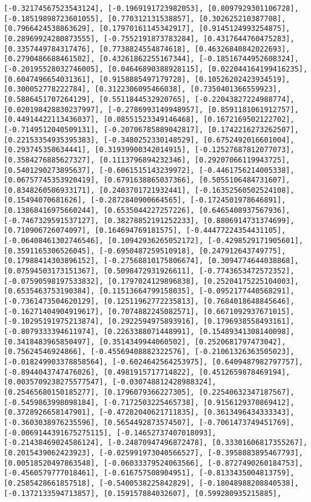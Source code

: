 \documentclass[11pt]{article}
\begin{document}
\begin{Verbatim}[commandchars=\\\{\}]
[-0.32174567523543124], [-0.1969191723982053], [0.8097929301106728], [-0.18519898723601055], [0.770312131538857], [0.302625210387708], [0.7966424538863629], [0.17970161145342917], [0.9145124993254875], [0.28969924280873555], [-0.7552191873783284], [0.4317644760475283], [0.3357449784317476], [0.7738824554874618], [0.46326840842022693], [0.2790486688461502], [0.43261862255167344], [-0.18516744952608324], [-0.20195528032746005], [0.04646890388928115], [0.022044164199416235], [0.6047496654031361], [0.9158885497179728], [0.10526202423934519], [0.300052778222784], [0.3122306095466038], [0.7350401366559923], [0.5886451707264129], [0.5511844532920765], [-0.22043827224988774], [0.020198428830237997], [-0.2786993149948957], [0.8591181061912757], [0.44914422113436037], [0.08551523349146468], [0.1672169502122702], [-0.7149512040509131], [-0.20706785889042817], [0.1742216273262507], [0.22153354935395383], [-0.3480252330148529], [0.6752492016601004], [0.293745350634441], [0.31939900342014915], [-0.12527687812077073], [0.3584276885627327], [0.1113796894232346], [0.29207066119943725], [0.5401290273895637], [-0.6061515143239972], [-0.4461756214005338], [0.06757745353920419], [0.6791638865037366], [0.5055106484731607], [0.8348260506933171], [0.2403701721932441], [-0.16352560502524108], [0.15494070681626], [-0.2872840900664565], [-0.1724501978646891], [0.13868416975660244], [0.6535044227257226], [0.6465408937567936], [-0.7467329591537127], [0.38278852191252233], [0.8806914731374699], [0.710906726074097], [0.164694769181575], [-0.44477224354431105], [-0.06408461302746546], [0.10942936265052172], [-0.4298529171905601], [0.3591165306526045], [-0.6950487259510918], [0.247912643749775], [0.17988414303896152], [-0.27568810175806674], [0.3094774644038868], [0.07594503173151367], [0.5098472931926611], [-0.7743653472572352], [-0.07590598197533832], [0.1797024129896838], [0.25204175225104003], [0.6535463753190384], [0.11513664799158035], [-0.0952177440568291], [-0.7361473504620129], [0.12511962772235813], [0.7684018648845646], [-0.16271404904919617], [0.7074882245082571], [0.6671092937671015], [-0.10295191975213874], [0.2922594975893916], [0.1796938558493161], [-0.8079333394611974], [0.2263388071448991], [0.15489341308140098], [0.3418483965850497], [0.3514349944060502], [0.2520681797473042], [0.75624546924866], [-0.45569408882322576], [-0.21061326363505023], [-0.018249903378858564], [-0.6024642564253975], [0.6409487982797757], [-0.8944043747476026], [0.4981915717714822], [0.4512659878469194], [0.0035709238275577547], [-0.030748812428988324], [0.25465680150185277], [0.1796079366227305], [0.22540632347187567], [-0.5459863998098184], [-0.7172503225465738], [0.9156129370869412], [0.3728926658147901], [-0.47282040621711835], [0.3613496434333343], [-0.3603038976235596], [0.5654492873574507], [-0.7061473749451769], [-0.0069144391675275115], [-0.14652737407018093], [-0.21438469024586124], [-0.24870947496872478], [0.33301606817355267], [0.2015439062423923], [-0.025991973040566527], [-0.3958083895467793], [0.00518520497863548], [-0.06033379524063566], [-0.8727490260184753], [-0.4560579777018461], [-0.616757508904951], [-0.8133435004813759], [0.2585428661857518], [-0.5400538225842829], [-0.18048988208840538], [-0.1372133594713857], [0.159157884032607], [0.599280935215885], 
\end{Verbatim}
\end{document}
